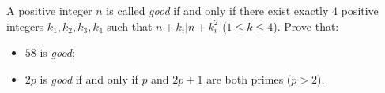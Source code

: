 A positive integer $n$ is called \textit{good} if and only if there exist exactly $4$ positive integers $k_1, k_2, k_3, k_4$ such that $n+k_i|n+k_i^2$ ($1 \leq k \leq 4$). Prove that:
\begin{itemize}
	\item $58$ is \textit{good};

	\item $2p$ is \textit{good} if and only if $p$ and $2p+1$ are both primes ($p>2$).
\end{itemize}
